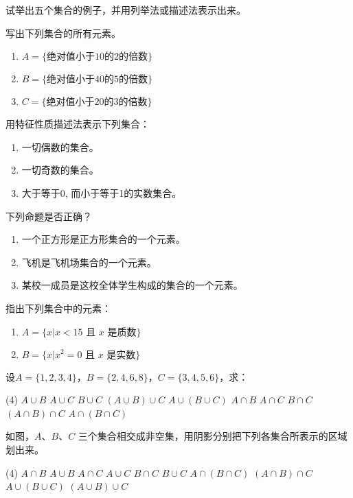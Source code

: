 \begin{Exercise}[复习题]
\begin{question}
	\item 试举出五个集合的例子，并用列举法或描述法表示出来。
	\item 写出下列集合的所有元素。
\begin{enumerate}
	\item $A=\{\text{绝对值小于10的2的倍数}\}$
	\item $B=\{\text{绝对值小于40的5的倍数}\}$
	\item $C=\{\text{绝对值小于20的3的倍数}\}$
\end{enumerate}

\item 用特征性质描述法表示下列集合：
\begin{enumerate}
	\item 一切偶数的集合。
	\item 一切奇数的集合。
	\item 大于等于0, 而小于等于1的实数集合。
\end{enumerate}

\item 下列命题是否正确？
\begin{enumerate}
	\item 一个正方形是正方形集合的一个元素。
	\item 飞机是飞机场集合的一个元素。
	\item 某校一成员是这校全体学生构成的集合的一个元素。
\end{enumerate}

\item 指出下列集合中的元素：
\begin{enumerate}
	\item $A=\{x|x<15\text{ 且 $x$ 是质数}\}$
	\item $B=\{x|x^2=0\text{ 且 $x$ 是实数}\}$
\end{enumerate}

\item 设$A=\{1,2,3,4\}$，$B=\{ 2,4,6,8\}$，$C=\{3,4,5,6\}$，求：
\begin{tasks}(4)
	\task $A\cup B$
	\task $A\cup C$
	\task $B\cup C$
	\task $(A\cup B)\cup C$
	\task $A\cup (B\cup C)$
	\task $A\cap B$
	\task $A\cap C$
	\task $B\cap C$
	\task $(A\cap B)\cap C$
	\task $A\cap (B\cap C)$
\end{tasks}	


\item 如图，$A$、$B$、$C$ 三个集合相交成非空集，用阴影分别把下列各集合所表示的区域划出来。
\begin{tasks}(4)
	\task $A\cap B$
	\task $A\cup B$
	\task $A\cap C$
	\task $A\cup C$
	\task $B\cap C$
	\task $B\cup C$
	\task $A\cap (B\cap C)$
	\task $(A\cap B)\cap C$
	\task $A\cup (B\cup C)$
	\task $(A\cup B)\cup C$
\end{tasks}	


\end{question}
\end{Exercise}
